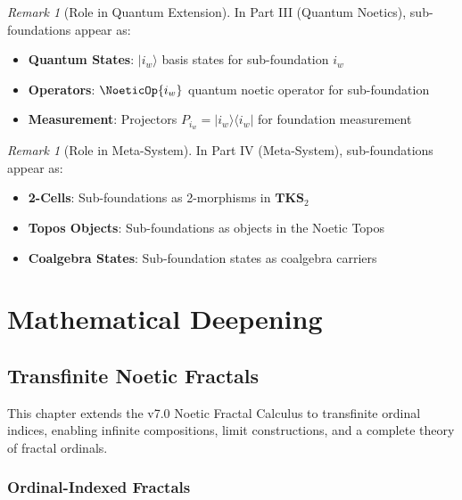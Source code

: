 \documentclass[11pt,twoside,openright]{book}
\theoremstyle{definition}
\theoremstyle{plain}
\theoremstyle{remark}
\newtheorem{remark}[definition]{Remark}
\newcommand{\qket}[1]{|#1\rangle}
\newcommand{\qbra}[1]{\langle #1|}
\newcommand{\vnewtwo}{\textbf{v7.2 New}}
\begin{document}
\begin{remark}[Role in Quantum Extension]
\label{rem:subfound-quantum}
In Part III (Quantum Noetics), sub-foundations appear as:
\begin{itemize}
  \item \textbf{Quantum States}: $\qket{i_w}$ basis states for sub-foundation $i_w$
  \item \textbf{Operators}: $\NoeticOp{i_w}$ quantum noetic operator for sub-foundation
  \item \textbf{Measurement}: Projectors $P_{i_w} = \qket{i_w}\qbra{i_w}$ for foundation measurement
\end{itemize}
\end{remark}

\begin{remark}[Role in Meta-System]
\label{rem:subfound-meta}
In Part IV (Meta-System), sub-foundations appear as:
\begin{itemize}
  \item \textbf{2-Cells}: Sub-foundations as 2-morphisms in $\mathbf{TKS}_2$
  \item \textbf{Topos Objects}: Sub-foundations as objects in the Noetic Topos
  \item \textbf{Coalgebra States}: Sub-foundation states as coalgebra carriers
\end{itemize}
\end{remark}

\part{Mathematical Deepening}

\chapter{Transfinite Noetic Fractals}
\label{ch:transfinite-fractals}

\begin{tcolorbox}[colback=blue!5!white,colframe=blue!75!black,title=\vnewtwo]
This chapter extends the v7.0 Noetic Fractal Calculus to transfinite ordinal indices, enabling infinite compositions, limit constructions, and a complete theory of fractal ordinals.
\end{tcolorbox}

\section{Ordinal-Indexed Fractals}
\end{document}
